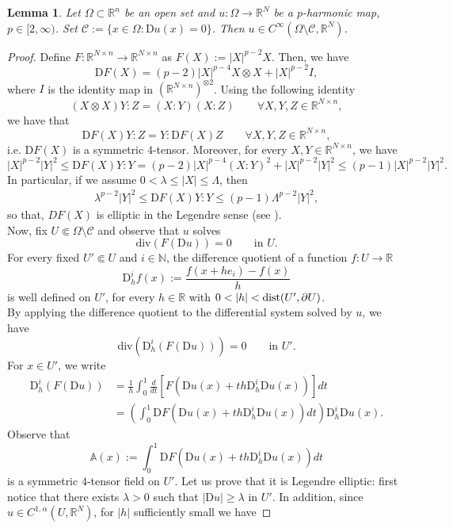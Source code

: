 \documentclass[a4paper,11pt]{article}
\numberwithin{equation}{section}
\newtheorem{Lemma}[Theorem]{Lemma}
\newcommand{\numberset}{\mathbb}
\newcommand{\N}{\numberset{N}}
\newcommand{\Om}{\Omega}
\newcommand{\R}{\numberset{R}}
\newcommand{\rom}{\mathrm}
\theoremstyle{definition}
\begin{document}
\begin{Lemma}\label{smoothness}
Let $\Om\subset\R^n$ be an open set and $u:\Om\to\R^N$ be a $p$-harmonic map, $p\in[2,\infty)$. Set $\mathscr{C}:=\{x\in\Om:\mathrm Du(x)=0\}$. Then $u\in C^\infty(\Omega\setminus\mathscr C, \R^N)$.
\end{Lemma}
\begin{proof}
Define $F:\R^{N\times n}\to \R^{N\times n}$ as $F(X):=|X|^{p-2}X$. Then, we have
$$
\rom DF(X)=(p-2)|X|^{p-4}X\otimes X+|X|^{p-2}I,
$$
where $I$ is the identity map in $(\R^{N\times n})^{\otimes 2}$.
Using the following identity
$$
(X\otimes X)Y:Z=(X:Y)(X:Z)\qquad\forall X,Y,Z\in \R^{N\times n},
$$ 
we have that
$$
\rom DF(X) Y:Z=Y:\rom DF(X)Z\qquad\forall X,Y,Z\in \R^{N\times n},
$$
i.e. $\rom DF(X)$ is a symmetric $4$-tensor.
Moreover, for every $X,Y\in \R^{N\times n}$, we have
$$
|X|^{p-2}|Y|^2\leq \rom DF(X)Y:Y=(p-2)|X|^{p-4}(X:Y)^2+|X|^{p-2}|Y|^2\leq(p-1)|X|^{p-2}|Y|^2.
$$
In particular, if we assume $0<\lambda\leq|X|\leq\Lambda$, then
\begin{align}\label{ellip}
\lambda^{p-2}|Y|^2\leq \rom DF(X)Y:Y\leq(p-1)\Lambda^{p-2}|Y|^2,
\end{align}
so that, $DF(X)$ is elliptic in the Legendre sense (see \cite{GM}).\\
Now, fix $U\Subset\Omega\setminus\mathscr C$ and observe that $u$ solves 
$$
\mathrm{div}(F(\rom Du))=0 \qquad\mbox{in }U.
$$
For every fixed $U'\Subset U$ and $i\in\N$, the difference quotient of a function $f:U\to \R$
$$
\rom D_h^if(x):=\frac{f(x+he_i)-f(x)}{h}
$$
is well defined on $U'$, for every $h\in \R$ with $0<|h|<{\rm dist}(U',\partial U)$. \\
By applying the difference quotient to the differential system solved by $u$, we have
$$
\mathrm{div}(\rom D_h^i(F(\rom Du)))=0 \qquad\mbox{in }U'.
$$
For $x\in U'$, we write
\begin{align*}
\rom D_h^i(F(\rom Du))&=\frac{1}{h}\int_0^1\frac{d}{dt} \left[F\left(\rom Du(x)+th\rom D_h^i\rom Du(x)\right)\right]dt\\
&=\left(\int_0^1\rom DF\left(\rom Du(x)+th\rom D_h^i\rom Du(x)\right)dt\right) \rom D_h^i \rom Du(x).
\end{align*}
Observe that
$$
\mathbb A(x):=\int_0^1\rom DF\left(\rom Du(x)+th\rom D_h^i\rom Du(x)\right)dt
$$
is a symmetric $4$-tensor field on $U'$. Let us prove that it is Legendre elliptic: first notice that there exists $\lambda>0$ such that $|\rom Du|\geq\lambda$ in $U'$. In addition, since $u\in C^{1,\alpha}(U,\R^N)$, for $|h|$ sufficiently small we have

\end{proof}
\end{document}
